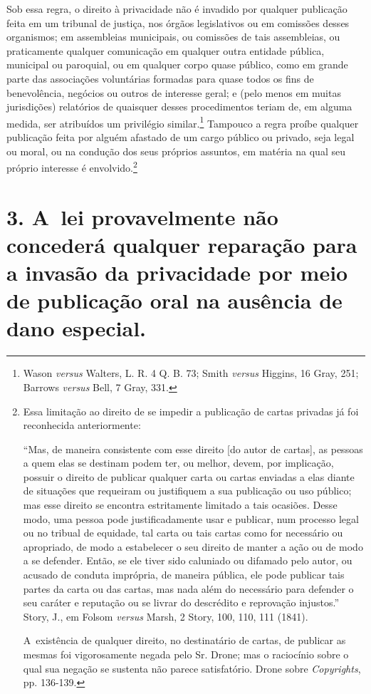 Sob essa regra, o direito à privacidade não é invadido por qualquer
publicação feita em um tribunal de justiça, nos órgãos legislativos ou
em comissões desses organismos; em assembleias municipais, ou comissões
de tais assembleias, ou praticamente qualquer comunicação em qualquer
outra entidade pública, municipal ou paroquial, ou em qualquer corpo
quase público, como em grande parte das associações voluntárias formadas
para quase todos os fins de benevolência, negócios ou outros de
interesse geral; e (pelo menos em muitas jurisdições) relatórios de
quaisquer desses procedimentos teriam de, em alguma medida, ser
atribuídos um privilégio similar.\footnote{Wason \emph{versus} Walters,
  L. R. 4 Q. B. 73; Smith \emph{versus} Higgins, 16 Gray, 251; Barrows
  \emph{versus} Bell, 7 Gray, 331.} Tampouco a regra proíbe qualquer
publicação feita por alguém afastado de um cargo público ou privado,
seja legal ou moral, ou na condução dos seus próprios assuntos, em
matéria na qual seu próprio interesse é envolvido.\footnote{Essa
  limitação ao direito de se impedir a publicação de cartas privadas já
  foi reconhecida anteriormente:

  ``Mas, de maneira consistente com esse direito {[}do autor de
  cartas{]}, as pessoas a quem elas se destinam podem ter, ou melhor,
  devem, por implicação, possuir o direito de publicar qualquer carta ou
  cartas enviadas a elas diante de situações que requeiram ou
  justifiquem a sua publicação ou uso público; mas esse direito se
  encontra estritamente limitado a tais ocasiões. Desse modo, uma pessoa
  pode justificadamente usar e publicar, num processo legal ou no
  tribual de equidade, tal carta ou tais cartas como for necessário ou
  apropriado, de modo a estabelecer o seu direito de manter a ação ou de
  modo a se defender. Então, se ele tiver sido caluniado ou difamado
  pelo autor, ou acusado de conduta imprópria, de maneira pública, ele
  pode publicar tais partes da carta ou das cartas, mas nada além do
  necessário para defender o seu caráter e reputação ou se livrar do
  descrédito e reprovação injustos.'' Story, J., em Folsom \emph{versus}
  Marsh, 2 Story, 100, 110, 111 (1841).

  A~existência de qualquer direito, no destinatário de cartas, de
  publicar as mesmas foi vigorosamente negada pelo Sr. Drone; mas o
  raciocínio sobre o qual sua negação se sustenta não parece
  satisfatório. Drone sobre \emph{Copyrights}, pp. 136-139.}

\section{3. A~lei provavelmente não concederá qualquer reparação para a
invasão da privacidade por meio de publicação oral na ausência de dano
especial.}

